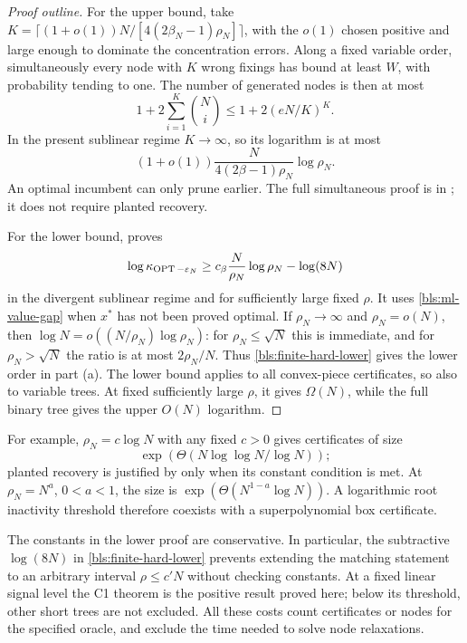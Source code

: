 \begin{proof}[Proof outline]
For the upper bound, take
$K=\lceil(1+o(1))N/[4(2\beta_N-1)\rho_N]\rceil$, with the $o(1)$
chosen positive and large enough to dominate the concentration errors.
Along a fixed variable order, simultaneously every node with $K$ wrong
fixings has bound at least $W$, with probability tending to one.  The
number of generated nodes is then at most
\begin{equation}
 1+2\sum_{i=1}^K\binom Ni
 \le1+2(eN/K)^K.
 \label{bls:static-tree-count}
\end{equation}
In the present sublinear regime $K\to\infty$, so its logarithm is at most
\begin{equation}
 (1+o(1))\frac{N}{4(2\beta-1)\rho_N}\log\rho_N.
 \label{bls:static-tree-exponent}
\end{equation}
An optimal incumbent can only prune earlier.  The full simultaneous
proof is in ; it does not require planted
recovery.

For the lower bound,  proves
\begin{equation}
 \log\kappa_{\operatorname{OPT}-\varepsilon_N}
 \ge c_\beta\frac N{\rho_N}\log\rho_N-\log(8N)
 \label{bls:finite-hard-lower}
\end{equation}
in the divergent sublinear regime and for sufficiently large fixed
$\rho$.  It uses \eqref{bls:ml-value-gap} when $x^*$ has not been proved
optimal.  If $\rho_N\to\infty$ and $\rho_N=o(N)$, then
$\log N=o((N/\rho_N)\log\rho_N)$: for $\rho_N\le\sqrt N$ this is
immediate, and for $\rho_N>\sqrt N$ the ratio is at most
$2\rho_N/N$.  Thus \eqref{bls:finite-hard-lower} gives the lower order in
part (a).  The lower bound applies to all convex-piece certificates, so
also to variable trees.  At fixed sufficiently large $\rho$, it gives
$\Omega(N)$, while the full binary tree gives the upper $O(N)$ logarithm.
\end{proof}

For example, $\rho_N=c\log N$ with any fixed $c>0$ gives certificates of
size
\[
 \exp(\Theta(N\log\log N/\log N));
\]
planted recovery is justified
by  only when its constant condition is met.  At
$\rho_N=N^a$, $0<a<1$, the size is
$\exp(\Theta(N^{1-a}\log N))$.  A logarithmic root inactivity threshold
therefore coexists with a superpolynomial box certificate.

The constants in the lower proof are conservative.  In particular, the
subtractive $\log(8N)$ in \eqref{bls:finite-hard-lower} prevents extending
the matching statement to an arbitrary interval $\rho\le c'N$ without
checking constants.  At a fixed linear signal level the C1 theorem is
the positive result proved here; below its threshold, other short trees
are not excluded.  All these costs count certificates or nodes for the
specified oracle, and exclude the time needed to solve node relaxations.
